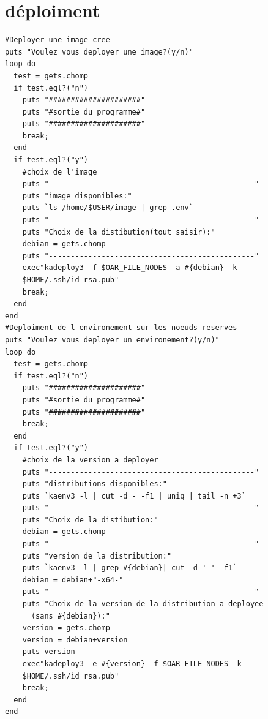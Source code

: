 \documentclass[a4paper,11pt]{report}
\begin{document}
      \newpage
      \section{déploiment}
      \begin{lstlisting}
#Deployer une image cree
puts "Voulez vous deployer une image?(y/n)"
loop do
  test = gets.chomp
  if test.eql?("n")
    puts "#####################"
    puts "#sortie du programme#"
    puts "#####################"
    break;
  end
  if test.eql?("y")
    #choix de l'image                                                                                                                 
    puts "-----------------------------------------------"
    puts "image disponibles:"
    puts `ls /home/$USER/image | grep .env`
    puts "-----------------------------------------------"
    puts "Choix de la distibution(tout saisir):"
    debian = gets.chomp
    puts "-----------------------------------------------"
    exec"kadeploy3 -f $OAR_FILE_NODES -a #{debian} -k 
	$HOME/.ssh/id_rsa.pub"
    break;
  end
end
#Deploiment de l environement sur les noeuds reserves                          
puts "Voulez vous deployer un environement?(y/n)"
loop do
  test = gets.chomp
  if test.eql?("n")
    puts "#####################"
    puts "#sortie du programme#"
    puts "#####################"
    break;
  end
  if test.eql?("y")                                                            
    #choix de la version a deployer                                            
    puts "-----------------------------------------------"
    puts "distributions disponibles:"
    puts `kaenv3 -l | cut -d - -f1 | uniq | tail -n +3`
    puts "-----------------------------------------------"
    puts "Choix de la distibution:"
    debian = gets.chomp
    puts "-----------------------------------------------"
    puts "version de la distribution:"
    puts `kaenv3 -l | grep #{debian}| cut -d ' ' -f1`
    debian = debian+"-x64-"
    puts "-----------------------------------------------"
    puts "Choix de la version de la distribution a deployee 
	  (sans #{debian}):"
    version = gets.chomp
    version = debian+version
    puts version
    exec"kadeploy3 -e #{version} -f $OAR_FILE_NODES -k 
	$HOME/.ssh/id_rsa.pub"
    break;
  end
end
      \end{lstlisting}

      
\end{document}
